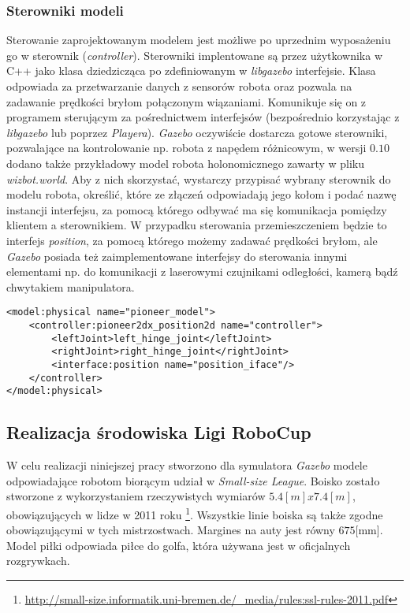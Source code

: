 	\subsubsection{Sterowniki modeli }
	Sterowanie zaprojektowanym modelem jest możliwe po uprzednim wyposażeniu go w sterownik (\textit{controller}). Sterowniki implentowane są przez użytkownika w C++ jako klasa dziedzicząca
	po zdefiniowanym w \textit{libgazebo} interfejsie. Klasa odpowiada za przetwarzanie danych z sensorów robota oraz pozwala
	na zadawanie prędkości bryłom połączonym wiązaniami. Komunikuje się on z programem sterującym za pośrednictwem interfejsów (bezpośrednio korzystając z \textit{libgazebo} lub poprzez \textit{Playera}).
	\textit{Gazebo} oczywiście dostarcza gotowe sterowniki, pozwalające na kontrolowanie np. robota z napędem różnicowym, w wersji $0.10$ dodano także przykładowy model robota holonomicznego zawarty
	w pliku \textit{wizbot.world}. Aby z nich skorzystać, wystarczy przypisać wybrany sterownik do modelu robota, określić, które ze złączeń odpowiadają jego kołom i podać nazwę instancji interfejsu,
	za pomocą którego odbywać ma się komunikacja pomiędzy klientem a sterownikiem. W przypadku sterowania przemieszczeniem będzie to interfejs \textit{position}, za pomocą którego możemy zadawać prędkości bryłom,
	ale \textit{Gazebo} posiada też zaimplementowane interfejsy do sterowania innymi elementami np. do komunikacji z laserowymi czujnikami odległości, kamerą bądź chwytakiem manipulatora. 
	\begin{lstlisting}
<model:physical name="pioneer_model">
    <controller:pioneer2dx_position2d name="controller">
        <leftJoint>left_hinge_joint</leftJoint>
        <rightJoint>right_hinge_joint</rightJoint>
        <interface:position name="position_iface"/>
    </controller>
</model:physical>
	\end{lstlisting}	

	
	\subsection{Realizacja środowiska Ligi RoboCup \label{subsect:realizacjaROBOCUP} }
	
	W celu realizacji niniejszej pracy stworzono dla symulatora \textit{Gazebo} modele odpowiadające robotom biorącym udział w \emph{Small-size League}. 
	Boisko zostało stworzone z wykorzystaniem rzeczywistych wymiarów $5.4[m] x 7.4[m]$, obowiązujących w lidze w 2011 roku 
	\protect\footnote{\url{http://small-size.informatik.uni-bremen.de/_media/rules:ssl-rules-2011.pdf}}. Wszystkie linie boiska są także zgodne obowiązującymi w tych mistrzostwach.
	Margines na auty jest równy $675$[mm].
	Model piłki odpowiada piłce do golfa, która używana jest w oficjalnych rozgrywkach.

